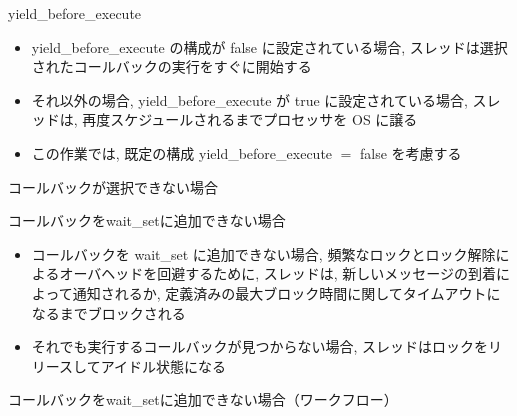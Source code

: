 \begin{frame}{yield\_before\_execute}
    \begin{itemize}
        \item yield\_before\_execute の構成が false に設定されている場合, スレッドは選択されたコールバックの実行をすぐに開始する
        \item それ以外の場合, yield\_before\_execute が true に設定されている場合, スレッドは, 再度スケジュールされるまでプロセッサを OS に譲る
        \item この作業では, 既定の構成 yield\_before\_execute $=$ false を考慮する
    \end{itemize}

\end{frame}

\begin{frame}{コールバックが選択できない場合}
\end{frame}

\begin{frame}{コールバックをwait\_setに追加できない場合}
    \begin{itemize}
        \item コールバックを wait\_set に追加できない場合, 頻繁なロックとロック解除によるオーバヘッドを回避するために, スレッドは, 新しいメッセージの到着によって通知されるか, 定義済みの最大ブロック時間に関してタイムアウトになるまでブロックされる
        \item それでも実行するコールバックが見つからない場合, スレッドはロックをリリースしてアイドル状態になる
    \end{itemize}
\end{frame}

\begin{frame}{コールバックをwait\_setに追加できない場合（ワークフロー）}
\end{frame}
